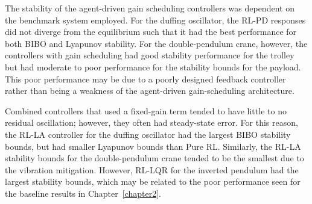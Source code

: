 The stability of the agent-driven gain scheduling controllers was dependent on the benchmark system employed.
For the duffing oscillator, the RL-PD responses did not diverge from the equilibrium such that it had the best performance for both BIBO and Lyapunov stability. For the double-pendulum crane, however, the controllers with gain scheduling had good stability performance for the trolley but had moderate to poor performance for the stability bounds for the payload. This poor performance may be due to a poorly designed feedback controller rather than being a weakness of the agent-driven gain-scheduling architecture.

Combined controllers that used a fixed-gain term tended to have little to no residual oscillation; however, they often had steady-state error. For this reason, the RL-LA controller for the duffing oscillator had the largest BIBO stability bounds, but had smaller Lyapunov bounds than Pure RL. Similarly, the RL-LA stability bounds for the double-pendulum crane tended to be the smallest due to the vibration mitigation. However, RL-LQR for the inverted pendulum had the largest stability bounds, which may be related to the poor performance seen for the baseline results in Chapter~\ref{chapter2}.

